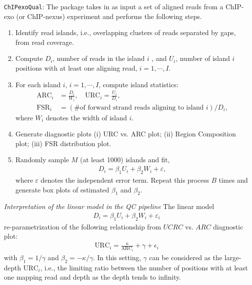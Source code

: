 \documentclass{bmcart}
\newcommand{\SK}[1]{\textcolor{red}{SK: #1}}
\begin{document}
\begin{framed}
  \noindent \texttt{ChIPexoQual}: The package takes in as input a set
  of aligned reads from a ChIP-exo (or ChIP-nexus) experiment and
  performs the following steps.

  \begin{enumerate}
  \item Identify read islands, i.e., overlapping clusters of reads
    separated by gaps, from read coverage.
  
  \item Compute $D_i$, number of reads in the island $i$ , and $U_i$,
    number of island $i$ positions with at least one aligning read,
    $i=1, \cdots, I$.

  \item For each island $i$, $i=1, \cdots, I$, compute island
    statistics:
  \begin{align*}
    \mbox{ARC}_i &= \frac{D_i}{W_i}, \quad \mbox{URC}_i = \frac{U_i}{D_i},  \\
    \mbox{FSR}_i &= (\text{\# of forward strand reads aligning to
      island $i$})/D_i,
  \end{align*}
  where $W_i$ denotes the width of island $i$.
\item Generate diagnostic plots (i) URC vs. ARC plot; (ii) Region
  Composition plot;
  (iii) FSR distribution plot.
\item Randomly sample $M$ (at least 1000) islands and fit,
  \begin{align*}
    D_i = \beta_1 U_i + \beta_2 W_i + \varepsilon,
  \end{align*}
  where $\varepsilon$ denotes the independent error term.  Repeat this
  process $B$ times and generate box plots of estimated $\beta_1$ and
  $\beta_2$.
\end{enumerate}

\end{framed}


\textit{Interpretation of the linear model in the QC pipeline}
The linear model
\begin{align*}
  D_i = \beta_1 U_i + \beta_2 W_i+\varepsilon_i
\end{align*}
 re-parametrization of the following relationship from $UCRC$ vs. $ARC$ diagnostic plot:
\begin{align}
  \mbox{URC}_i = \frac{\kappa}{\mbox{ARC}_i} + \gamma + \epsilon_i
\label{mod}
\end{align}
with $\beta_1 = 1 / \gamma$ and $\beta_2 = - \kappa / \gamma$. In this
setting, $\gamma$ can be considered as the large-depth $\mbox{URC}_i$,
i.e., the limiting ratio between the number of positions with at least
one mapping read and depth as the depth tends to infinity.
\end{document}
